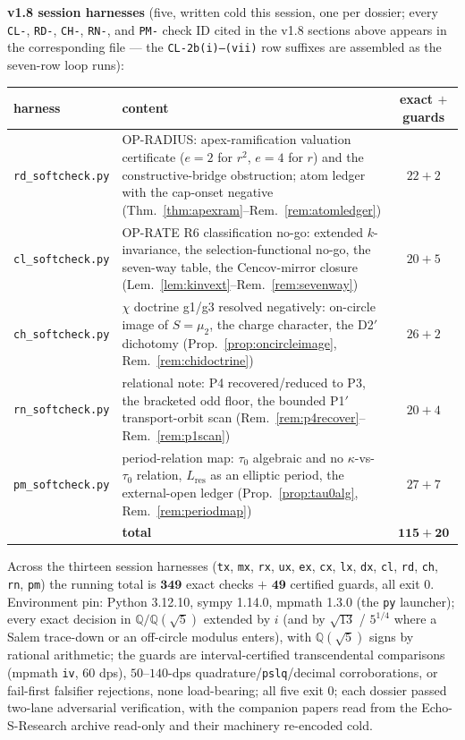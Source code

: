 \documentclass[11pt]{article}
\newcommand{\hx}[1]{\textcolor{cC}{\footnotesize\texttt{#1}}}
\newcommand{\Q}{\mathbb{Q}}
\theoremstyle{plain}
\theoremstyle{definition}
\theoremstyle{remark}
\begin{document}
\smallskip\noindent
\textbf{v1.8 session harnesses} (five, written cold this session, one per
dossier; every \hx{CL-}, \hx{RD-}, \hx{CH-}, \hx{RN-}, and \hx{PM-} check ID
cited in the v1.8 sections above appears in the corresponding file --- the
\hx{CL-2b(i)--(vii)} row suffixes are assembled as the seven-row loop runs):
\begin{center}\footnotesize\setlength{\tabcolsep}{4pt}
\begin{tabular}{@{}lp{10.7cm}c@{}}
\toprule
harness & content & exact $+$ guards\\
\midrule
\texttt{rd\_softcheck.py} & OP-RADIUS: apex-ramification valuation certificate ($e=2$ for $r^2$, $e=4$ for $r$) and the constructive-bridge obstruction; atom ledger with the cap-onset negative (Thm.~\ref{thm:apexram}--Rem.~\ref{rem:atomledger}) & $22+2$\\
\texttt{cl\_softcheck.py} & OP-RATE R6 classification no-go: extended $k$-invariance, the selection-functional no-go, the seven-way table, the Cencov-mirror closure (Lem.~\ref{lem:kinvext}--Rem.~\ref{rem:sevenway}) & $20+5$\\
\texttt{ch\_softcheck.py} & $\chi$ doctrine g1/g3 resolved negatively: on-circle image of $S=\mu_2$, the charge character, the D2$'$ dichotomy (Prop.~\ref{prop:oncircleimage}, Rem.~\ref{rem:chidoctrine}) & $26+2$\\
\texttt{rn\_softcheck.py} & relational note: P4 recovered/reduced to P3, the bracketed odd floor, the bounded P1$'$ transport-orbit scan (Rem.~\ref{rem:p4recover}--Rem.~\ref{rem:p1scan}) & $20+4$\\
\texttt{pm\_softcheck.py} & period-relation map: $\tau_0$ algebraic and no $\kappa$-vs-$\tau_0$ relation, $L_{\mathrm{res}}$ as an elliptic period, the external-open ledger (Prop.~\ref{prop:tau0alg}, Rem.~\ref{rem:periodmap}) & $27+7$\\
\midrule
 & \textbf{total} & $\mathbf{115+20}$\\
\bottomrule
\end{tabular}
\end{center}
Across the thirteen session harnesses (\texttt{tx}, \texttt{mx}, \texttt{rx},
\texttt{ux}, \texttt{ex}, \texttt{cx}, \texttt{lx}, \texttt{dx}, \texttt{cl},
\texttt{rd}, \texttt{ch}, \texttt{rn}, \texttt{pm}) the running total is
$\mathbf{349}$ exact checks $+$ $\mathbf{49}$ certified guards, all exit 0.
Environment pin: Python 3.12.10, sympy 1.14.0, mpmath 1.3.0 (the \texttt{py}
launcher); every exact decision in $\Q/\Q(\sqrt5)$ extended by $i$ (and by
$\sqrt{13}$ / $5^{1/4}$ where a Salem trace-down or an off-circle modulus
enters), with $\Q(\sqrt5)$ signs by rational arithmetic; the guards are
interval-certified transcendental comparisons (mpmath \texttt{iv}, 60 dps),
$50$--$140$-dps quadrature/\texttt{pslq}/decimal corroborations, or fail-first
falsifier rejections, none load-bearing; all five exit 0; each dossier passed
two-lane adversarial verification, with the companion papers read from the
Echo-S-Research archive read-only and their machinery re-encoded cold.
\end{document}
